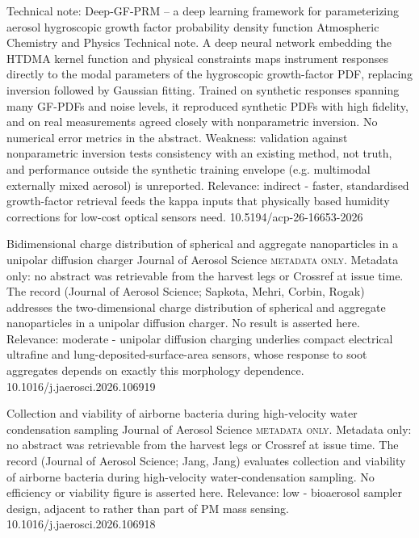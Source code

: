 \documentclass[10pt]{article}
\begin{document}
{Technical note: Deep-GF-PRM – a deep learning framework for parameterizing aerosol hygroscopic growth factor probability density function}
{Atmospheric Chemistry and Physics}
{Technical note. A deep neural network embedding the HTDMA kernel function and physical constraints maps instrument responses directly to the modal parameters of the hygroscopic growth-factor PDF, replacing inversion followed by Gaussian fitting. Trained on synthetic responses spanning many GF-PDFs and noise levels, it reproduced synthetic PDFs with high fidelity, and on real measurements agreed closely with nonparametric inversion. No numerical error metrics in the abstract. Weakness: validation against nonparametric inversion tests consistency with an existing method, not truth, and performance outside the synthetic training envelope (e.g. multimodal externally mixed aerosol) is unreported. Relevance: indirect - faster, standardised growth-factor retrieval feeds the kappa inputs that physically based humidity corrections for low-cost optical sensors need.}
{10.5194/acp-26-16653-2026}

{Bidimensional charge distribution of spherical and aggregate nanoparticles in a unipolar diffusion charger}
{Journal of Aerosol Science}
{\textsc{metadata only.} Metadata only: no abstract was retrievable from the harvest legs or Crossref at issue time. The record (Journal of Aerosol Science; Sapkota, Mehri, Corbin, Rogak) addresses the two-dimensional charge distribution of spherical and aggregate nanoparticles in a unipolar diffusion charger. No result is asserted here. Relevance: moderate - unipolar diffusion charging underlies compact electrical ultrafine and lung-deposited-surface-area sensors, whose response to soot aggregates depends on exactly this morphology dependence.}
{10.1016/j.jaerosci.2026.106919}

{Collection and viability of airborne bacteria during high-velocity water condensation sampling}
{Journal of Aerosol Science}
{\textsc{metadata only.} Metadata only: no abstract was retrievable from the harvest legs or Crossref at issue time. The record (Journal of Aerosol Science; Jang, Jang) evaluates collection and viability of airborne bacteria during high-velocity water-condensation sampling. No efficiency or viability figure is asserted here. Relevance: low - bioaerosol sampler design, adjacent to rather than part of PM mass sensing.}
{10.1016/j.jaerosci.2026.106918}
\end{document}
